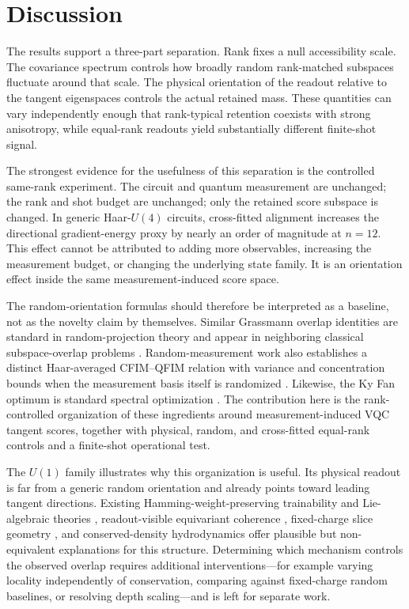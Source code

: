 \documentclass[aps,pra,reprint,superscriptaddress,nofootinbib,longbibliography]{revtex4-2}
\begin{document}
\section{Discussion}

The results support a three-part separation. Rank fixes a null accessibility scale. The covariance spectrum controls how broadly random rank-matched subspaces fluctuate around that scale. The physical orientation of the readout relative to the tangent eigenspaces controls the actual retained mass. These quantities can vary independently enough that rank-typical retention coexists with strong anisotropy, while equal-rank readouts yield substantially different finite-shot signal.

The strongest evidence for the usefulness of this separation is the controlled same-rank experiment. The circuit and quantum measurement are unchanged; the rank and shot budget are unchanged; only the retained score subspace is changed. In generic Haar-$U(4)$ circuits, cross-fitted alignment increases the directional gradient-energy proxy by nearly an order of magnitude at $n=12$. This effect cannot be attributed to adding more observables, increasing the measurement budget, or changing the underlying state family. It is an orientation effect inside the same measurement-induced score space.

The random-orientation formulas should therefore be interpreted as a baseline, not as the novelty claim by themselves. Similar Grassmann overlap identities are standard in random-projection theory and appear in neighboring classical subspace-overlap problems \cite{Fernandez2025}. Random-measurement work also establishes a distinct Haar-averaged CFIM--QFIM relation with variance and concentration bounds when the measurement basis itself is randomized \cite{LuSha2025}. Likewise, the Ky Fan optimum is standard spectral optimization \cite{KyFan1949}. The contribution here is the rank-controlled organization of these ingredients around measurement-induced VQC tangent scores, together with physical, random, and cross-fitted equal-rank controls and a finite-shot operational test.

The $U(1)$ family illustrates why this organization is useful. Its physical readout is far from a generic random orientation and already points toward leading tangent directions. Existing Hamming-weight-preserving trainability and Lie-algebraic theories \cite{Monbroussou2025,Fontana2024,Ragone2024}, readout-visible equivariant coherence \cite{UgailHoward2026}, fixed-charge slice geometry \cite{Filmus2016}, and conserved-density hydrodynamics \cite{Khemani2018,Rakovszky2018} offer plausible but non-equivalent explanations for this structure. Determining which mechanism controls the observed overlap requires additional interventions---for example varying locality independently of conservation, comparing against fixed-charge random baselines, or resolving depth scaling---and is left for separate work.
\end{document}
